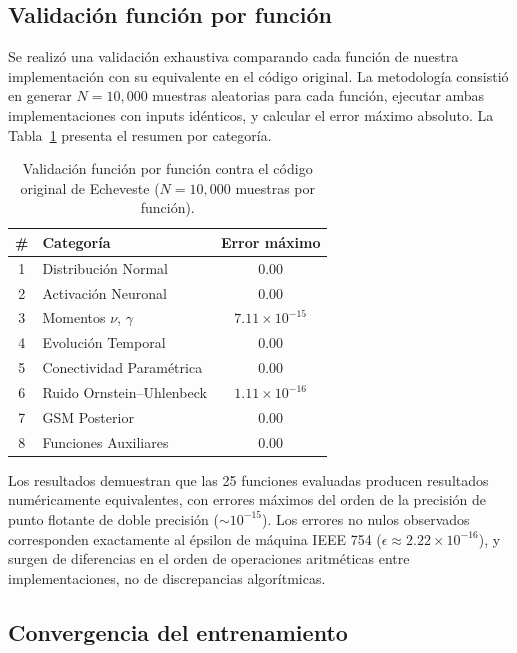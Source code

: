 \documentclass{llncs}
\begin{document}
\subsection{Validación función por función}

Se realizó una validación exhaustiva comparando cada función de
nuestra implementación con su equivalente en el código original. La
metodología consistió en generar $N = 10{,}000$ muestras aleatorias
para cada función, ejecutar ambas implementaciones con inputs
idénticos, y calcular el error máximo absoluto. La
Tabla~\ref{tab:validation} presenta el resumen por categoría.

\begin{table}[!ht]
\centering
\caption{Validación función por función contra el código original de
Echeveste ($N = 10{,}000$ muestras por función).}
\label{tab:validation}
\begin{tabular}{clc}
\toprule
\textbf{\#} & \textbf{Categoría} & \textbf{Error máximo} \\
\midrule
1 & Distribución Normal & $0.00$ \\
2 & Activación Neuronal & $0.00$ \\
3 & Momentos $\nu$, $\gamma$ & $7.11 \times 10^{-15}$ \\
4 & Evolución Temporal & $0.00$ \\
5 & Conectividad Paramétrica & $0.00$ \\
6 & Ruido Ornstein--Uhlenbeck & $1.11 \times 10^{-16}$ \\
7 & GSM Posterior & $0.00$ \\
8 & Funciones Auxiliares & $0.00$ \\
\bottomrule
\end{tabular}
\end{table}

Los resultados demuestran que las 25 funciones evaluadas producen
resultados numéricamente equivalentes, con errores máximos del orden
de la precisión de punto flotante de doble precisión
($\sim 10^{-15}$). Los errores no nulos observados corresponden
exactamente al épsilon de máquina IEEE 754
($\epsilon \approx 2.22 \times 10^{-16}$), y surgen de diferencias en
el orden de operaciones aritméticas entre implementaciones, no de
discrepancias algorítmicas.

\subsection{Convergencia del entrenamiento}
\end{document}
